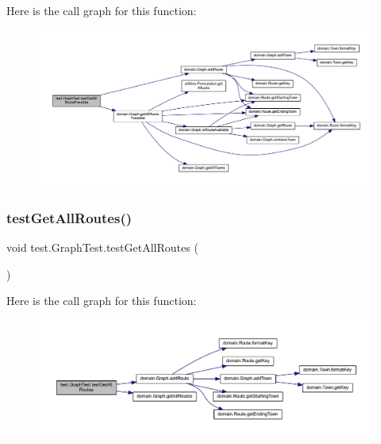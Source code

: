 Here is the call graph for this function\+:\nopagebreak
\begin{figure}[H]
\begin{center}
\leavevmode
\includegraphics[width=350pt]{classtest_1_1_graph_test_a6ba6493ed4d053e9476f9e15744f4f11_cgraph}
\end{center}
\end{figure}
\mbox{\label{classtest_1_1_graph_test_a3c859de54ad38354bbfe0a99f79ab817}} 
\subsubsection{\texorpdfstring{test\+Get\+All\+Routes()}{testGetAllRoutes()}}
{\footnotesize\ttfamily void test.\+Graph\+Test.\+test\+Get\+All\+Routes (\begin{DoxyParamCaption}{ }\end{DoxyParamCaption})}

Here is the call graph for this function\+:\nopagebreak
\begin{figure}[H]
\begin{center}
\leavevmode
\includegraphics[width=350pt]{classtest_1_1_graph_test_a3c859de54ad38354bbfe0a99f79ab817_cgraph}
\end{center}
\end{figure}
\mbox{\label{classtest_1_1_graph_test_a8979ac672a459b1549444d94b4e4b46f}} 
